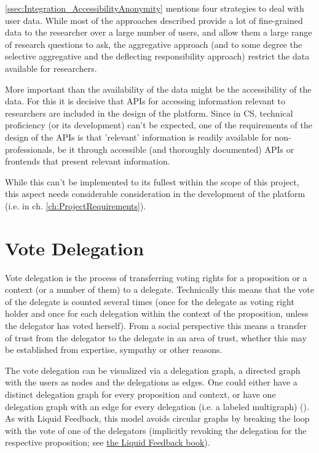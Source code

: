 \ref{ssec:Integration_AccessibilityAnonymity} mentions four strategies to deal with user data. While most of the approaches described provide a lot of fine-grained data to the researcher over a large number of users, and allow them a large range of research questions to ask, the aggregative approach (and to some degree the selective aggregative and the deflecting responsibility approach) restrict the data available for researchers. 

More important than the availability of the data might be the accessibility of the data. For this it is decisive that APIs for accessing information relevant to researchers are included in the design of the platform. Since in CS, technical proficiency (or its development) can't be expected, one of the requirements of the design of the APIs is that 'relevant' information is readily available for non-professionals, be it through accessible (and thoroughly documented) APIs or frontends that present relevant information.

While this can't be implemented to its fullest within the scope of this project, this aspect needs considerable consideration in the development of the platform (i.e. in ch. \ref{ch:ProjectRequirements}).

\section{Vote Delegation}
\label{sec:Model_VoteDelegation}
Vote delegation is the process of transferring voting rights for a proposition or a context (or a number of them) to a delegate. Technically this means that the vote of the delegate is counted several times (once for the delegate as voting right holder and once for each delegation within the context of the proposition, unless the delegator has voted herself). From a social perspective this means a transfer of trust from the delegator to the delegate in an area of trust, whether this may be established from expertise, sympathy or other reasons. 

The vote delegation can be visualized via a delegation graph, a directed graph with the users as nodes and the delegations as edges. One could either have a distinct delegation graph for every proposition and context, or have one delegation graph with an edge for every delegation (i.e. a labeled multigraph) (). As with Liquid Feedback, this model avoids circular graphs by breaking the loop with the vote of one of the delegators (implicitly revoking the delegation for the respective proposition; see \href{http://principles.liquidfeedback.org/}{the Liquid Feedback book}).

